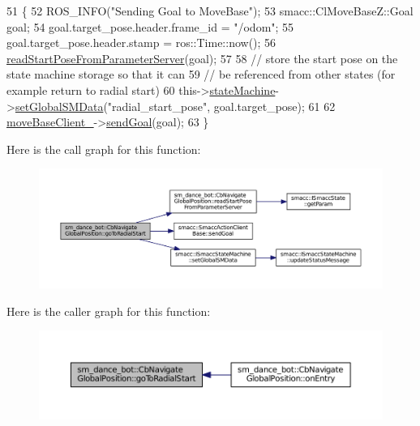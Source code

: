 \begin{DoxyCode}
51   \{
52     ROS\_INFO(\textcolor{stringliteral}{"Sending Goal to MoveBase"});
53     smacc::ClMoveBaseZ::Goal goal;
54     goal.target\_pose.header.frame\_id = \textcolor{stringliteral}{"/odom"};
55     goal.target\_pose.header.stamp = ros::Time::now();
56     \hyperlink{classsm__dance__bot_1_1CbNavigateGlobalPosition_a81b78925b3ab8a426f471cb74d0b9756}{readStartPoseFromParameterServer}(goal);
57 
58     \textcolor{comment}{// store the start pose on the state machine storage so that it can}
59     \textcolor{comment}{// be referenced from other states (for example return to radial start)}
60     this->\hyperlink{classsmacc_1_1SmaccClientBehavior_aa1c28c177d50a471c88c6a577cd6077e}{stateMachine}->\hyperlink{classsmacc_1_1ISmaccStateMachine_a8588f9e580fbb95b53e2bd2ca3ff1f98}{setGlobalSMData}(\textcolor{stringliteral}{"radial\_start\_pose"}, goal.target\_pose);
61 
62     \hyperlink{classsm__dance__bot_1_1CbNavigateGlobalPosition_a1d94ab79bdffa994748287c09bd8c18e}{moveBaseClient\_}->\hyperlink{classsmacc_1_1SmaccActionClientBase_a58c67a87c5fb8ea1633573c58fe3eee1}{sendGoal}(goal);
63   \}
\end{DoxyCode}


Here is the call graph for this function\+:
\nopagebreak
\begin{figure}[H]
\begin{center}
\leavevmode
\includegraphics[width=350pt]{classsm__dance__bot_1_1CbNavigateGlobalPosition_a0832f7a7f205cc483be012aef9501312_cgraph}
\end{center}
\end{figure}




Here is the caller graph for this function\+:
\nopagebreak
\begin{figure}[H]
\begin{center}
\leavevmode
\includegraphics[width=350pt]{classsm__dance__bot_1_1CbNavigateGlobalPosition_a0832f7a7f205cc483be012aef9501312_icgraph}
\end{center}
\end{figure}


